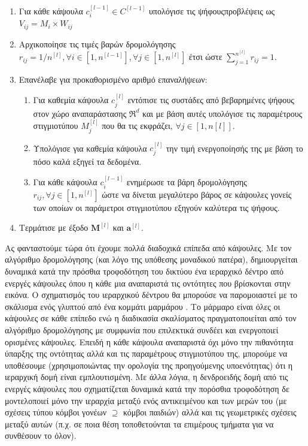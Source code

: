 \begin{enumerate}
  \item Για κάθε κάψουλα $c_i^{[l-1]} \in C^{[l-1]}$ υπολόγισε τις ψήφους\textendash προβλέψεις ως $V_{ij}=M_i \times W_{ij}$
  \item Αρχικοποίησε τις τιμές βαρών δρομολόγησης $r_{ij}=1/n^{[l]},\forall i \in [1,n^{[l-1]}],\forall j \in [1,n^{[l]}]$ έτσι ώστε $\sum_{j = 1}^{n^{[l]}}r_{ij} = 1$.
  \item Επανέλαβε για προκαθορισμένο αριθμό επαναλήψεων:
  \begin{enumerate}
    \item Για καθεμία κάψουλα $c_j^{[l]}$ εντόπισε τις συστάδες από βεβαρημένες ψήφους στον χώρο αναπαράστασης $\Re^d$ και με βάση αυτές υπολόγισε τις παραμέτρους στιγμιοτύπου $M_j^{[l]}$ που θα τις εκφράζει, $\forall j \in [1,n{[l]}]$.
    \item Υπολόγισε για καθεμία κάψουλα $c_j^{[l]}$ την τιμή ενεργοποίησής της με βάση το πόσο καλά εξηγεί τα δεδομένα.
    \item Για κάθε κάψουλα $c_i^{[l-1]}$ ενημέρωσε τα βάρη δρομολόγησης $r_{ij}, \forall j \in [1,n^{[l]}]$ ώστε να δίνεται μεγαλύτερο βάρος σε κάψουλες γονείς των οποίων οι παράμετροι στιγμιοτύπου εξηγούν καλύτερα τις ψήφους.
  \end{enumerate}
    
  \item Τερμάτισε με έξοδο $\boldsymbol{M}^{[l]}$ και $\boldsymbol{a}^{[l]}$.
\end{enumerate}

Ας φανταστούμε τώρα ότι έχουμε πολλά διαδοχικά επίπεδα από κάψουλες. Με τον αλγόριθμο δρομολόγησης (και λόγο της υπόθεσης μοναδικού πατέρα), δημιουργείται δυναμικά κατά την πρόσθια τροφοδότηση του δικτύου ένα ιεραρχικό δέντρο από ενεργές κάψουλες όπου η κάθε μια αναπαριστά τις οντότητες που βρίσκονται στην εικόνα. Ο σχηματισμός του ιεραρχικού δέντρου θα μπορούσε να παρομοιαστεί με το σκάλισμα ενός γλυπτού από ένα κομμάτι μαρμάρου \cite{sabour2017dynamic}. Το μάρμαρο είναι όλες οι κάψουλες σε κάθε επίπεδο ενώ η διαδικασία σκαλίσματος πραγματοποιείται από τον αλγόριθμο δρομολόγησης με συμφωνία που επιλεκτικά συνδέει και ενεργοποιεί ορισμένες κάψουλες. Επειδή η κάθε κάψουλα αναπαριστά όχι μόνο την πιθανότητα ύπαρξης της οντότητας αλλά και τις παραμέτρους στιγμιοτύπου της, μπορούμε να υποθέσουμε (χρησιμοποιώντας την ορολογία της προηγούμενης υποενότητας) ότι η ιεραρχική δομή είναι εμπλουτισμένη. Με άλλα λόγια, η δενδροειδής δομή από τις ενεργές κάψουλες που σχηματίζεται δυναμικά κατά την πορόσθια τροφοδότηση δε μοντελοποιεί μόνο την ιεραρχία μεταξύ ενός αντικειμένου και των μερών του (με σχέσεις τύπου κόμβοι γονέων $\supseteq$ κόμβοι παιδιών) αλλά και τις γεωμετρικές σχέσεις μεταξύ αυτών (π.χ. σε ποια θέση τοποθετούνται τα επιμέρους τμήματα για να συνθέσουν το όλον).\par


